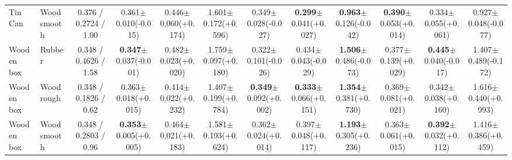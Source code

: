 \begin{table}[t]
{\begin{tabular}{l l c c c c c c c c c c }
        Tin Can & Wood smooth & 0.376 / 0.2724 / 1.00 & 0.361$\pm$0.010(-0.015) & 0.446$\pm$0.060(+0.174) & 1.601$\pm$0.172(+0.596) & 0.349$\pm$0.028(-0.027) & \textbf{0.299}$\pm$0.041(+0.027) & \textbf{0.963}$\pm$0.126(-0.042) & \textbf{0.390}$\pm$0.053(+0.014) & 0.334$\pm$0.055(+0.061) & 0.927$\pm$0.048(-0.077) \\
        Wooden box & Rubber & 0.348 / 0.4626 / 1.58 & \textbf{0.347}$\pm$0.037(-0.001) & 0.482$\pm$0.023(+0.020) & 1.759$\pm$0.097(+0.180) & 0.322$\pm$0.101(-0.026) & 0.434$\pm$0.043(-0.029) & \textbf{1.506}$\pm$0.486(-0.073) & 0.377$\pm$0.139(+0.029) & \textbf{0.445}$\pm$0.040(-0.017) & 1.407$\pm$0.489(-0.172) \\
        Wooden box & Wood rough & 0.348 / 0.1826 / 0.62 & 0.363$\pm$0.018(+0.015) & 0.414$\pm$0.022(+0.232) & 1.407$\pm$0.199(+0.784) & \textbf{0.349}$\pm$0.092(+0.002) & \textbf{0.333}$\pm$0.066(+0.151) & \textbf{1.354}$\pm$0.381(+0.730) & 0.369$\pm$0.081(+0.021) & 0.342$\pm$0.038(+0.160) & 1.616$\pm$0.440(+0.993) \\
        Wooden box & Wood smooth & 0.348 / 0.2803 / 0.96 & \textbf{0.353}$\pm$0.005(+0.005) & 0.464$\pm$0.021(+0.183) & 1.581$\pm$0.193(+0.624) & 0.362$\pm$0.024(+0.014) & 0.397$\pm$0.048(+0.117) & \textbf{1.193}$\pm$0.305(+0.236) & 0.363$\pm$0.061(+0.015) & \textbf{0.392}$\pm$0.032(+0.112) & 1.416$\pm$0.386(+0.459) \\
        \bottomrule
    \end{tabular}
    }
\end{table}
